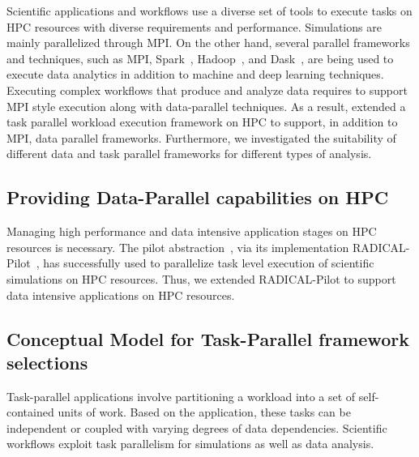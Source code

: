 Scientific applications and workflows use a diverse set of tools to execute 
tasks on HPC resources with diverse requirements and performance. Simulations 
are mainly parallelized through MPI. On the other hand, several parallel 
frameworks and techniques, such as MPI, Spark~\cite{zaharia2010spark}, 
Hadoop~\cite{hadoop}, and Dask~\cite{rocklin2015dask}, are being used to 
execute data analytics in addition to machine and deep learning techniques. 
Executing complex workflows that produce and analyze data requires to support 
MPI style execution along with data-parallel techniques. As a result, extended 
a task parallel workload execution framework on HPC to support, in addition to 
MPI, data parallel frameworks. Furthermore, we investigated the suitability of 
different data and task parallel frameworks for different types of analysis.

\subsection{Providing Data-Parallel capabilities on HPC}
Managing high performance and data intensive application stages on HPC resources 
is necessary. The pilot abstraction~\cite{turilli2018comprehensive}, via its 
implementation RADICAL-Pilot~\cite{merzky2019using}, has successfully used to 
parallelize task level execution of scientific simulations on HPC resources. 
Thus, we extended RADICAL-Pilot to support data intensive applications on HPC 
resources. 


\subsection{Conceptual Model for Task-Parallel framework selections}
Task-parallel applications involve partitioning a workload into a set of self-
contained units of work. Based on the application, these tasks can be 
independent or coupled with varying degrees of data dependencies. Scientific 
workflows exploit task parallelism for simulations as well as data analysis.

